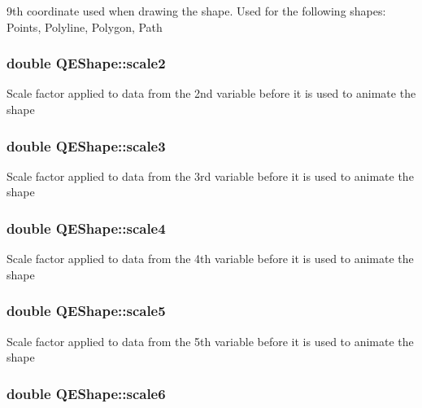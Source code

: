 9th coordinate used when drawing the shape. Used for the following shapes: Points, Polyline, Polygon, Path \hypertarget{classQEShape_af607170e722e09eabb07b4aff0925d6e}{
\subsubsection[{scale2}]{\setlength{\rightskip}{0pt plus 5cm}double QEShape::scale2}}
\label{classQEShape_af607170e722e09eabb07b4aff0925d6e}
Scale factor applied to data from the 2nd variable before it is used to animate the shape \hypertarget{classQEShape_abb13edc7d6921d3053f3eaa548d2b0c4}{
\subsubsection[{scale3}]{\setlength{\rightskip}{0pt plus 5cm}double QEShape::scale3}}
\label{classQEShape_abb13edc7d6921d3053f3eaa548d2b0c4}
Scale factor applied to data from the 3rd variable before it is used to animate the shape \hypertarget{classQEShape_a0feed87d7fa5693b7d2811aec5c292bd}{
\subsubsection[{scale4}]{\setlength{\rightskip}{0pt plus 5cm}double QEShape::scale4}}
\label{classQEShape_a0feed87d7fa5693b7d2811aec5c292bd}
Scale factor applied to data from the 4th variable before it is used to animate the shape \hypertarget{classQEShape_a5ad50163b31a75075c9a09a056a51d98}{
\subsubsection[{scale5}]{\setlength{\rightskip}{0pt plus 5cm}double QEShape::scale5}}
\label{classQEShape_a5ad50163b31a75075c9a09a056a51d98}
Scale factor applied to data from the 5th variable before it is used to animate the shape \hypertarget{classQEShape_a381195400bee141aea3ec023a686351b}{
\subsubsection[{scale6}]{\setlength{\rightskip}{0pt plus 5cm}double QEShape::scale6}}
